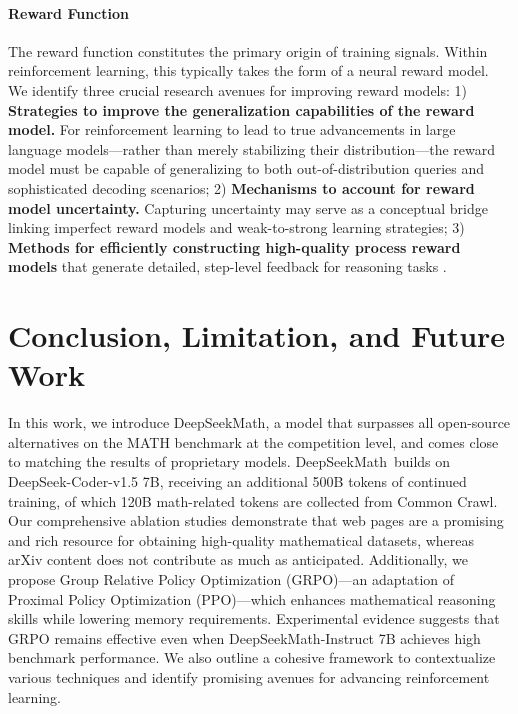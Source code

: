 {\paragraph{Reward Function} The reward function constitutes the primary origin of training signals. Within reinforcement learning, this typically takes the form of a neural reward model. We identify three crucial research avenues for improving reward models: 1) \textbf{Strategies to improve the generalization capabilities of the reward model.} For reinforcement learning to lead to true advancements in large language models—rather than merely stabilizing their distribution—the reward model must be capable of generalizing to both out-of-distribution queries and sophisticated decoding scenarios; 2) \textbf{Mechanisms to account for reward model uncertainty.} Capturing uncertainty may serve as a conceptual bridge linking imperfect reward models and weak-to-strong learning strategies; 3) \textbf{Methods for efficiently constructing high-quality process reward models} that generate detailed, step-level feedback for reasoning tasks \citep{lightman2023let,wang2023math}.

\section{Conclusion, Limitation, and Future Work} In this work, we introduce DeepSeekMath, a model that surpasses all open-source alternatives on the MATH benchmark at the competition level, and comes close to matching the results of proprietary models. DeepSeekMath~builds on DeepSeek-Coder-v1.5 7B, receiving an additional 500B tokens of continued training, of which 120B math-related tokens are collected from Common Crawl. Our comprehensive ablation studies demonstrate that web pages are a promising and rich resource for obtaining high-quality mathematical datasets, whereas arXiv content does not contribute as much as anticipated. Additionally, we propose Group Relative Policy Optimization (GRPO)—an adaptation of Proximal Policy Optimization (PPO)—which enhances mathematical reasoning skills while lowering memory requirements. Experimental evidence suggests that GRPO remains effective even when DeepSeekMath-Instruct 7B achieves high benchmark performance. We also outline a cohesive framework to contextualize various techniques and identify promising avenues for advancing reinforcement learning.

}
